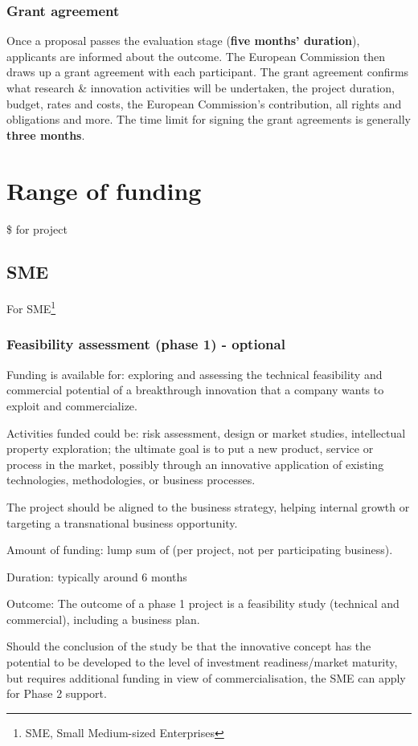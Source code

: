 \documentclass{article}
\begin{document}
\subsubsection{Grant agreement}
Once a proposal passes the evaluation stage (\textbf{five months’ duration}), applicants are informed about the outcome. The European Commission then draws up a grant agreement with each participant. The grant agreement confirms what research \& innovation activities will be undertaken, the project duration, budget, rates and costs, the European Commission's contribution, all rights and obligations and more. The time limit for signing the grant agreements is generally \textbf{three months}.


\section{Range of funding}
\$ for project

\subsection{SME}
\label{sub:sme}
For SME\footnote{SME, Small Medium-sized Enterprises}
\subsubsection{Feasibility assessment (phase 1) - optional}

Funding is available for: exploring and assessing the technical feasibility and commercial potential of a breakthrough innovation that a company wants to exploit and commercialize.

Activities funded could be: risk assessment, design or market studies, intellectual property exploration; the ultimate goal is to put a new product, service or process in the market, possibly through an innovative application of existing technologies, methodologies, or business processes.

The project should be aligned to the business strategy, helping internal growth or targeting a transnational business opportunity.

Amount of funding: lump sum of  (per project, not per participating business).

Duration: typically around 6 months

Outcome: The outcome of a phase 1 project is a feasibility study (technical and commercial), including a business plan.

Should the conclusion of the study be that the innovative concept has the potential to be developed to the level of investment readiness/market maturity, but requires additional funding in view of commercialisation, the SME can apply for Phase 2 support.
\end{document}
